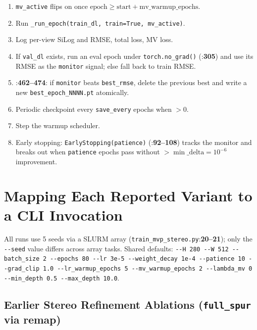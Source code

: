 \documentclass[11pt]{article}
\newcommand{\fref}[2]{\texttt{\textcolor{filegray}{#1}}:\textbf{#2}}
\begin{document}
\begin{enumerate}[leftmargin=2em]
  \item \texttt{mv\_active} flips on once
        $\text{epoch} \geq \text{start} + \text{mv\_warmup\_epochs}$.
  \item Run \texttt{\_run\_epoch(train\_dl, train=True, mv\_active)}.
  \item Log per-view SiLog and RMSE, total loss, MV loss.
  \item If \texttt{val\_dl} exists, run an eval epoch under
        \texttt{torch.no\_grad()} (\fref{}{305}) and use its RMSE as
        the \texttt{monitor} signal; else fall back to train RMSE.
  \item \fref{}{462--474}: if \texttt{monitor} beats \texttt{best\_rmse},
        delete the previous best and write a new
        \texttt{best\_epoch\_NNNN.pt} atomically.
  \item Periodic checkpoint every \texttt{save\_every} epochs when
        $>0$.
  \item Step the warmup scheduler.
  \item Early stopping: \texttt{EarlyStopping(patience)}
        (\fref{}{92--108}) tracks the monitor and breaks out when
        \texttt{patience} epochs pass without
        $> \min\_\text{delta}=10^{-6}$ improvement.
\end{enumerate}

\section{Mapping Each Reported Variant to a CLI Invocation}

All runs use 5 seeds via a SLURM array
(\fref{train\_mvp\_stereo.py}{20--21}); only the \texttt{-{}-seed} value
differs across array tasks. Shared defaults:
\texttt{-{}-H 280 -{}-W 512 -{}-batch\_size 2 -{}-epochs 80
-{}-lr 3e-5 -{}-weight\_decay 1e-4 -{}-patience 10
-{}-grad\_clip 1.0 -{}-lr\_warmup\_epochs 5 -{}-mv\_warmup\_epochs 2
-{}-lambda\_mv 0 -{}-min\_depth 0.5 -{}-max\_depth 10.0}.

\subsection{Earlier Stereo Refinement Ablations (\texttt{full\_spur} via remap)}
\end{document}
